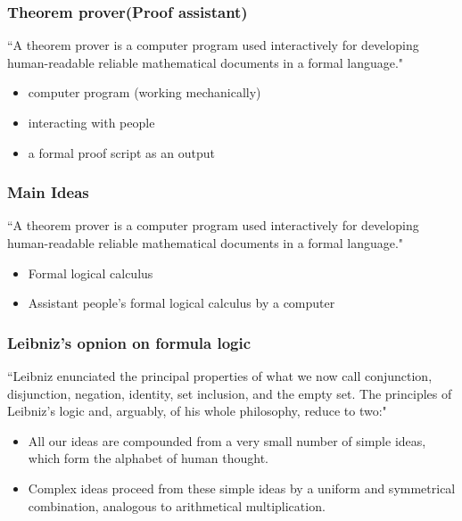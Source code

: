 \documentclass{beamer}
\begin{document}






\begin{frame}\frametitle{Theorem prover(Proof assistant)}
\noindent
``A theorem prover is a computer program used interactively for developing human-readable reliable mathematical documents in a formal language."
\begin{itemize}
\item computer program (working mechanically)
\item interacting with people
\item a formal proof script as an output
\end{itemize}
\end{frame}

\begin{frame}\frametitle{Main Ideas}
\noindent
``A theorem prover is a computer program used interactively for developing human-readable reliable mathematical documents in a formal language."
\begin{itemize}
\item Formal logical calculus
\item Assistant people's formal logical calculus by a computer
\end{itemize}
\end{frame}


\begin{frame}\frametitle{Leibniz's opnion on formula logic }
``Leibniz enunciated the principal properties of what we now call conjunction, disjunction, negation, identity, set inclusion, and the empty set.
The principles of Leibniz's logic and, arguably, of his whole philosophy, reduce to two:"
\begin{itemize}
\item  All our ideas are compounded from a very small number of simple ideas, which form the alphabet of human thought.
\item Complex ideas proceed from these simple ideas by a uniform and symmetrical combination, analogous to arithmetical multiplication.
\end{itemize}
\end{frame}
\end{document}
